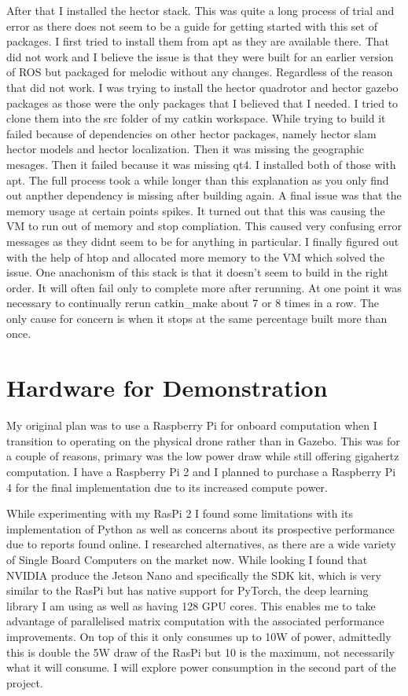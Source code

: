 \documentclass[]{../resources/final_report}
\begin{document}
After that I installed the hector stack. This was quite a long process of trial and error as there 
does not seem to be a guide for getting started with this set of packages. I first tried to install 
them from apt as they are available there. That did not work and I believe the issue is that they 
were built for an earlier version of ROS but packaged for melodic without any changes. Regardless 
of the reason that did not work. I was trying to install the hector quadrotor and hector gazebo 
packages as those were the only packages that I believed that I needed. I tried to clone them into 
the src folder of my catkin workspace. While trying to build it failed because of dependencies on 
other hector packages, namely hector slam hector models and hector localization. Then it was missing 
the geographic mesages. Then it failed because it was missing qt4. I installed both of those with 
apt. The full process took a while longer than this explanation as you only find out anpther 
dependency is missing after building again. A final issue was that the memory usage at certain 
points spikes. It turned out that this was causing the VM to run out of memory and stop compliation. 
This caused very confusing error messages as they didnt seem to be for anything in particular. I 
finally figured out with the help of htop and allocated more memory to the VM which solved the issue. 
One anachonism of this stack is that it doesn't seem to build in the right order. It will often fail 
only to complete more after rerunning. At one point it was necessary to continually rerun catkin\_make 
about 7 or 8 times in a row. The only cause for concern is when it stops at the same percentage built more 
than once. 


\section{Hardware for Demonstration}

My original plan was to use a Raspberry Pi for onboard computation when I transition to 
operating on the physical drone rather than in Gazebo. This was for a couple of reasons, primary was 
the low power draw while still offering gigahertz computation. I have a Raspberry Pi 2 and I planned 
to purchase a Raspberry Pi 4 for the final implementation due to its increased compute power.

While experimenting with my RasPi 2 I found some limitations with its implementation of Python as 
well as concerns about its prospective performance due to reports found online. I researched 
alternatives, as there are a wide variety of Single Board Computers on the market now. While looking 
I found that NVIDIA produce the Jetson Nano and specifically the SDK kit, which is very similar to 
the RasPi but has native support for PyTorch, the deep learning library I am using as well as having 
128 GPU cores. This enables me to take advantage of parallelised matrix computation with the 
associated performance improvements. On top of this it only consumes up to 10W of power, admittedly 
this is double the 5W draw of the RasPi but 10 is the maximum, not necessarily what it will consume. 
I will explore power consumption in the second part of the project.
\end{document}
